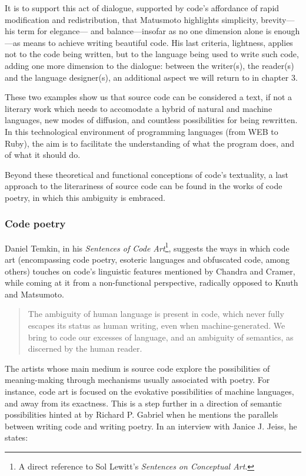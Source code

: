 It is to support this act of dialogue, supported by code's affordance of rapid modification and redistribution, that Matusmoto highlights simplicity, brevity—his term for elegance— and balance—insofar as no one dimension alone is enough—as means to achieve writing beautiful code. His last criteria, lightness, applies not to the code being written, but to the language being used to write such code, adding one more dimension to the dialogue: between the writer(s), the reader(s) and the language designer(s), an additional aspect we will return to in chapter 3.

These two examples show us that source code can be considered a text, if not a literary work which needs to accomodate a hybrid of natural and machine languages, new modes of diffusion, and countless possibilities for being rewritten. In this technological environment of programming languages (from WEB to Ruby), the aim is to facilitate the understanding of what the program does, and of what it should do.

Beyond these theoretical and functional conceptions of code's textuality, a last approach to the literariness of source code can be found in the works of code poetry, in which this ambiguity is embraced.

\subsubsection{Code poetry}

Daniel Temkin, in his \emph{Sentences of Code Art}\footnote{A direct reference to Sol Lewitt's \emph{Sentences on Conceptual Art}.}, suggests the ways in which code art (encompassing code poetry, esoteric languages and obfuscated code, among others) touches on code's linguistic features mentioned by Chandra and Cramer, while coming at it from a non-functional perspective, radically opposed to Knuth and Matsumoto.

\begin{quote}
  The ambiguity of human language is present in code, which never fully escapes its status as human writing, even when machine-generated. We bring to code our excesses of language, and an ambiguity of semantics, as discerned by the human reader. \citep{temkin_sentences_2017}
\end{quote}

The artists whose main medium is source code explore the possibilities of meaning-making through mechanisms usually associated with poetry. For instance, code art is focused on the evokative possibilities of machine languages, and away from its exactness. This is a step further in a direction of semantic possibilities hinted at by Richard P. Gabriel when he mentions the parallels between writing code and writing poetry. In an interview with Janice J. Jeiss, he states:

